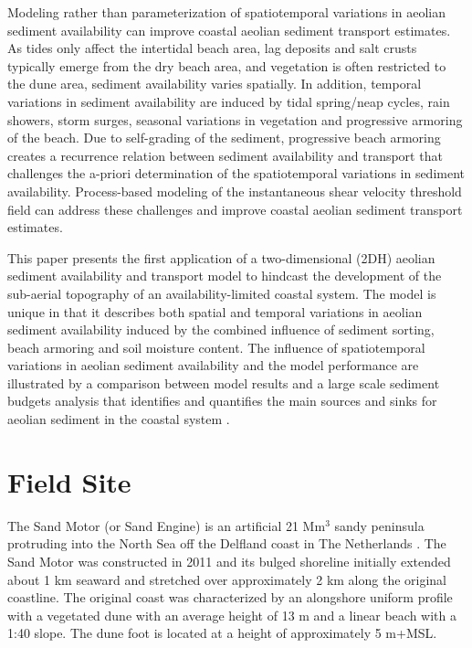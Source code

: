 Modeling rather than parameterization of spatiotemporal variations in
aeolian sediment availability can improve coastal aeolian sediment
transport estimates. As tides only affect the intertidal beach area,
lag deposits and salt crusts typically emerge from the dry beach area,
and vegetation is often restricted to the dune area, sediment
availability varies spatially. In addition, temporal variations in
sediment availability are induced by tidal spring/neap cycles, rain
showers, storm surges, seasonal variations in vegetation and
progressive armoring of the beach. Due to self-grading of the
sediment, progressive beach armoring creates a recurrence relation
between sediment availability and transport that challenges the
a-priori determination of the spatiotemporal variations in sediment
availability. Process-based modeling of the instantaneous shear
velocity threshold field can address these challenges and improve
coastal aeolian sediment transport estimates.

This paper presents the first application of a two-dimensional (2DH)
aeolian sediment availability and transport model \citep{Hoonhout2016}
to hindcast the development of the sub-aerial topography of an
availability-limited coastal system. The model is unique in that it
describes both spatial and temporal variations in aeolian sediment
availability induced by the combined influence of sediment sorting,
beach armoring and soil moisture content. The influence of
spatiotemporal variations in aeolian sediment availability and the
model performance are illustrated by a comparison between model
results and a large scale sediment budgets analysis that identifies
and quantifies the main sources and sinks for aeolian sediment in the
coastal system \citep{Hoonhout2017a}.


\section{Field Site}
\label{sec:fieldsite3}

The Sand Motor (or Sand Engine) is an artificial 21 $\mathrm{Mm^3}$
sandy peninsula protruding into the North Sea off the Delfland coast
in The Netherlands \citep[Figure \ref{fig:fieldsite3},][]{Stive2013}.
The Sand Motor was constructed in 2011 and its bulged shoreline
initially extended about 1 km seaward and stretched over approximately
2 km along the original coastline. The original coast was
characterized by an alongshore uniform profile with a vegetated dune
with an average height of 13 m and a linear beach with a 1:40
slope. The dune foot is located at a height of approximately 5 m+MSL.

